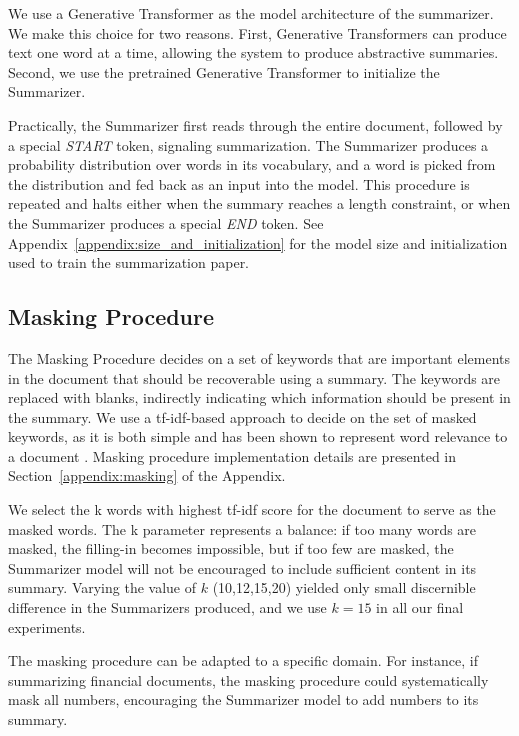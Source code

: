 \documentclass[11pt,a4paper]{article}
\begin{document}
We use a Generative Transformer \cite{radford2019language} as the model architecture of the summarizer. We make this choice for two reasons. First, Generative Transformers can produce text one word at a time, allowing the system to produce abstractive summaries.
Second, we use the pretrained Generative Transformer to initialize the Summarizer.

Practically, the Summarizer first reads through the entire document, followed by a special \textit{START} token, signaling  summarization. The Summarizer produces a probability distribution over words in its vocabulary, and a word is picked from the distribution and fed back as an input into the model. This procedure is repeated and halts either when the summary reaches a length constraint, or when the Summarizer produces a special \textit{END} token. See Appendix~\ref{appendix:size_and_initialization} for the model size and initialization used to train the summarization paper.

\subsection{Masking Procedure}
\label{section:masking_procedure}
The Masking Procedure decides on a set of keywords that are important elements in the document that should be recoverable using a summary. The keywords are replaced with blanks, indirectly indicating which information should be present in the summary.
We use a tf-idf-based approach to decide on the set of masked keywords, as it is both simple and has been shown to represent word relevance to a document \cite{Ramos2003UsingTT}. Masking procedure implementation details are presented in Section~\ref{appendix:masking} of the Appendix.

We select the k words with highest tf-idf score for the document to serve as the masked words. The k parameter represents a balance: if too many words are masked, the filling-in becomes impossible, but if too few are masked, the Summarizer model will not be encouraged to include sufficient content in its summary. Varying the value of $k$ (10,12,15,20) yielded only small discernible difference in the Summarizers produced, and we use $k=15$ in all our final experiments. 

The masking procedure can be adapted to a specific domain. For instance, if summarizing financial documents, the masking procedure could systematically mask all numbers, encouraging the Summarizer model to add numbers to its summary.
\end{document}
